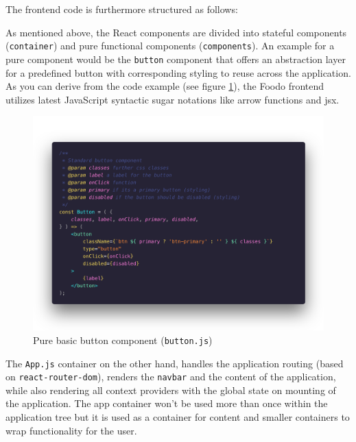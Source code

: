 
The frontend code is furthermore structured as follows:


As mentioned above, the React components are divided into stateful components (\texttt{container}) and pure functional components (\texttt{components}). An example for a pure component would be the \texttt{button} component that offers an abstraction layer for a predefined button with corresponding styling to reuse across the application. As you can derive from the code example (see figure \ref{fig:button}), the Foodo frontend utilizes latest JavaScript syntactic sugar notations like arrow functions and \gls{jsx}.

\begin{figure}[!ht]
	\captionsetup{justification=centering}
	\centering
		\includegraphics[scale=0.28]{Ressourcen/img/code/button.png}
		\vspace{-3em}
		\caption{Pure basic button component (\texttt{button.js})}
		\label{fig:button}
\end{figure}

The \texttt{App.js} container on the other hand, handles the application routing (based on \texttt{react-router-dom}), renders the \texttt{navbar} and the content of the application, while also rendering all context providers with the global state on mounting of the application. The app container won’t be used more than once within the application tree but it is used as a container for content and smaller containers to wrap functionality for the user. 

